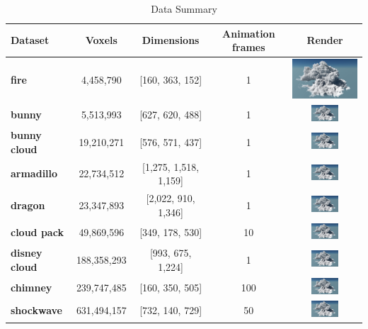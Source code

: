 \begin{table}[htbp]
    \centering 
    \begin{tabularx}{\textwidth}{|X|c|c|c|c|}
    \hline
    \textbf{Dataset} & \textbf{Voxels} & \textbf{Dimensions} & \textbf{Animation frames} & \textbf{Render}\\
    \hline
    \textbf{fire} & 4,458,790 & [160, 363, 152] & 1 & \includegraphics[width=4cm]{figures/disney _cloud.png}\\
    \hline
    \textbf{bunny} & 5,513,993 & [627, 620, 488] & 1 & \includegraphics[width=1cm]{figures/disney _cloud.png}\\
    \hline
    \textbf{bunny cloud} & 19,210,271 & [576, 571, 437] & 1 & \includegraphics[width=1cm]{figures/disney _cloud.png}\\
    \hline
    \textbf{armadillo} & 22,734,512 & [1,275, 1,518, 1,159] & 1 & \includegraphics[width=1cm]{figures/disney _cloud.png}\\
    \hline
    \textbf{dragon} & 23,347,893 & [2,022, 910, 1,346] & 1 & \includegraphics[width=1cm]{figures/disney _cloud.png}\\
    \hline
    \textbf{cloud pack} & 49,869,596 & [349, 178, 530] & 10 & \includegraphics[width=1cm]{figures/disney _cloud.png}\\
    \hline
    \textbf{disney cloud} & 188,358,293 & [993, 675, 1,224] & 1 & \includegraphics[width=1cm]{figures/disney _cloud.png}\\
    \hline
    \textbf{chimney} & 239,747,485 & [160, 350, 505] & 100 & \includegraphics[width=1cm]{figures/disney _cloud.png}\\
    \hline
    \textbf{shockwave} & 631,494,157 & [732, 140, 729] & 50 & \includegraphics[width=1cm]{figures/disney _cloud.png}\\
    \hline
    \end{tabularx}
    \caption{Data Summary}
    \label{tab:data-summary}
\end{table}


